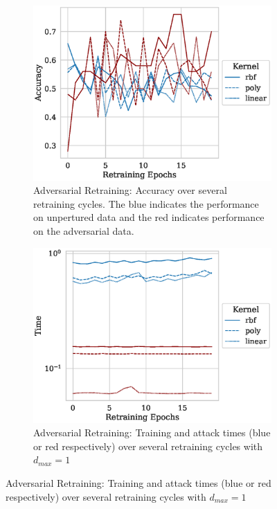 \documentclass[fonts]{icst}
\begin{document}
\begin{figure}
     \centering
     \begin{subfigure}[b]{0.45\textwidth}
         \centering
         \includegraphics[width=\textwidth]{./generated/retrain_accuracy.eps}
         \caption{Adversarial Retraining: Accuracy over several retraining cycles.
The blue indicates the performance on unpertured data and the red indicates performance on the adversarial data.}
        \label{fig:retrain_acc}
     \end{subfigure}
     \hfill
     \begin{subfigure}[b]{0.45\textwidth}
         \centering
         \includegraphics[width=\textwidth]{./generated/retrain_time.eps}
         \caption{Adversarial Retraining: Training and attack times (blue or red respectively) over several retraining cycles with $d_{max} = 1$}

\end{subfigure}
\end{figure}
\end{document}
